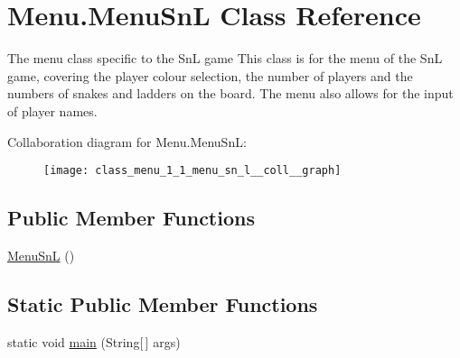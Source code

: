 \hypertarget{class_menu_1_1_menu_sn_l}{}\section{Menu.\+Menu\+Sn\+L Class Reference}
\label{class_menu_1_1_menu_sn_l}


The menu class specific to the Sn\+L game This class is for the menu of the Sn\+L game, covering the player colour selection, the number of players and the numbers of snakes and ladders on the board. The menu also allows for the input of player names.  




Collaboration diagram for Menu.\+Menu\+Sn\+L\+:\nopagebreak
\begin{figure}[H]
\begin{center}
\leavevmode
\texttt{[image: class\_menu\_1\_1\_menu\_sn\_l\_\_coll\_\_graph]}
\end{center}
\end{figure}
\subsection*{Public Member Functions}
\begin{DoxyCompactItemize}
\item 
\hyperlink{class_menu_1_1_menu_sn_l_a39167b25cf1ab4be1f66b6a327635e7b}{Menu\+Sn\+L} ()
\end{DoxyCompactItemize}
\subsection*{Static Public Member Functions}
\begin{DoxyCompactItemize}
\item 
static void \hyperlink{class_menu_1_1_menu_sn_l_af94b678ab820b841c5d39e683a7e26c5}{main} (String\mbox{[}$\,$\mbox{]} args)
\end{DoxyCompactItemize}
